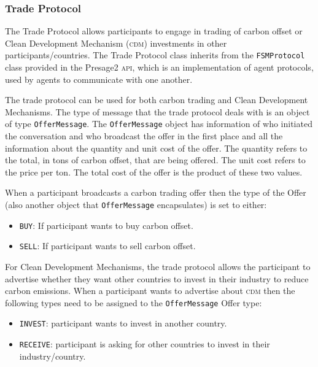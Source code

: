 \subsubsection{Trade Protocol}

The Trade Protocol allows participants to engage in trading of carbon offset or Clean Development Mechanism (\textsc{cdm}) investments in other participants/countries. The Trade Protocol class inherits from the \texttt{FSMProtocol} class provided in the Presage2 \textsc{api}, which is an implementation of agent protocols, used by agents to communicate with one another.
 
The trade protocol can be used for both carbon trading and Clean Development Mechanisms. The type of message that the trade protocol deals with is an object of type \texttt{OfferMessage}. The \texttt{OfferMessage} object has information of who initiated the conversation and who broadcast the offer in the first place and all the information about the quantity and unit cost of the offer. The quantity refers to the total, in tons of carbon offset, that are being offered. The unit cost refers to the price per ton. The total cost of the offer is the product of these two values.

When a participant broadcasts a carbon trading offer then the type of the Offer (also another 
object that \texttt{OfferMessage} encapsulates) is set to either:
 
\begin{itemize}
	\item \texttt{BUY}: If participant wants to buy carbon offset.
	\item \texttt{SELL}: If participant wants to sell carbon offset.
\end{itemize}

For Clean Development Mechanisms, the trade protocol allows the participant to advertise whether they want other countries to invest in their industry to reduce carbon emissions. When a participant wants to advertise about \textsc{cdm} then the following types need to be assigned to the \texttt{OfferMessage} Offer type:

\begin{itemize}
	\item \texttt{INVEST}: participant wants to invest in another country.
	\item \texttt{RECEIVE}: participant is asking for other countries to invest in their industry/country.
\end{itemize}


